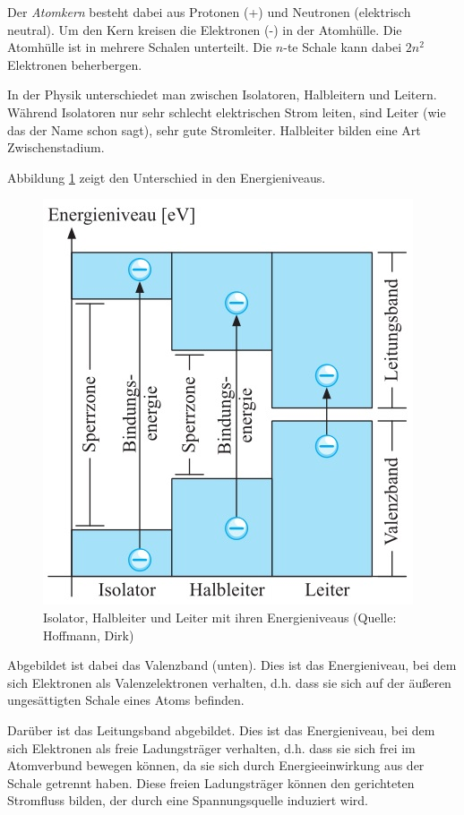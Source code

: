 Der \emph{Atomkern} besteht dabei aus Protonen (+) und Neutronen (elektrisch neutral).
Um den Kern kreisen die Elektronen (-) in der Atomhülle.
Die Atomhülle ist in mehrere Schalen unterteilt. Die $n$-te Schale kann dabei $2n^2$ Elektronen beherbergen.



In der Physik unterschiedet man zwischen Isolatoren, Halbleitern und Leitern.
Während Isolatoren nur sehr schlecht elektrischen Strom leiten, sind Leiter (wie das der Name schon sagt), sehr gute Stromleiter.
Halbleiter bilden eine Art Zwischenstadium.

Abbildung \ref{Abb:Energieniveau} zeigt den Unterschied in den Energieniveaus.


\begin{figure}[htp]
\begin{center}
\includegraphics[scale=.8]{pics/Bindungsenergie}
\caption{Isolator, Halbleiter und Leiter mit ihren Energieniveaus (Quelle: Hoffmann, Dirk)}
\label{Abb:Energieniveau}
\end{center}
\end{figure}

Abgebildet ist dabei das Valenzband (unten).
Dies ist das Energieniveau, bei dem sich Elektronen als Valenzelektronen verhalten, d.h. dass sie sich auf der äußeren ungesättigten Schale eines Atoms befinden.

Darüber ist das Leitungsband abgebildet.
Dies ist das Energieniveau, bei dem sich Elektronen als freie Ladungsträger verhalten, d.h. dass sie sich frei im Atomverbund bewegen können, da sie sich durch Energieeinwirkung aus der Schale getrennt haben.
Diese freien Ladungsträger können den gerichteten Stromfluss bilden, der durch eine Spannungsquelle induziert wird.

